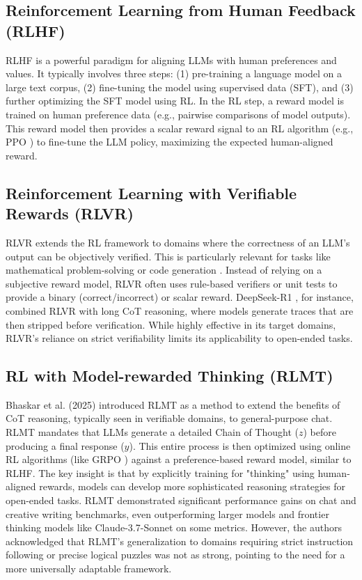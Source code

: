 \documentclass{article}
\begin{document}
\subsection{Reinforcement Learning from Human Feedback (RLHF)}
RLHF \cite{christiano2017deep, ouyang2022training} is a powerful paradigm for aligning LLMs with human preferences and values. It typically involves three steps: (1) pre-training a language model on a large text corpus, (2) fine-tuning the model using supervised data (SFT), and (3) further optimizing the SFT model using RL. In the RL step, a reward model is trained on human preference data (e.g., pairwise comparisons of model outputs). This reward model then provides a scalar reward signal to an RL algorithm (e.g., PPO \cite{schulman2017proximal}) to fine-tune the LLM policy, maximizing the expected human-aligned reward.

\subsection{Reinforcement Learning with Verifiable Rewards (RLVR)}
RLVR extends the RL framework to domains where the correctness of an LLM's output can be objectively verified. This is particularly relevant for tasks like mathematical problem-solving \cite{kazemnejad2025vineppo} or code generation \cite{deepseek2025deepseek}. Instead of relying on a subjective reward model, RLVR often uses rule-based verifiers or unit tests to provide a binary (correct/incorrect) or scalar reward. DeepSeek-R1 \cite{deepseek2025deepseek}, for instance, combined RLVR with long CoT reasoning, where models generate traces that are then stripped before verification. While highly effective in its target domains, RLVR's reliance on strict verifiability limits its applicability to open-ended tasks.

\subsection{RL with Model-rewarded Thinking (RLMT)}
Bhaskar et al. (2025) introduced RLMT \cite{bhaskar2025language} as a method to extend the benefits of CoT reasoning, typically seen in verifiable domains, to general-purpose chat. RLMT mandates that LLMs generate a detailed Chain of Thought ($z$) before producing a final response ($y$). This entire process is then optimized using online RL algorithms (like GRPO \cite{shao2024deepseekmath}) against a preference-based reward model, similar to RLHF. The key insight is that by explicitly training for "thinking" using human-aligned rewards, models can develop more sophisticated reasoning strategies for open-ended tasks. RLMT demonstrated significant performance gains on chat and creative writing benchmarks, even outperforming larger models and frontier thinking models like Claude-3.7-Sonnet on some metrics. However, the authors acknowledged that RLMT's generalization to domains requiring strict instruction following or precise logical puzzles was not as strong, pointing to the need for a more universally adaptable framework.
\end{document}
